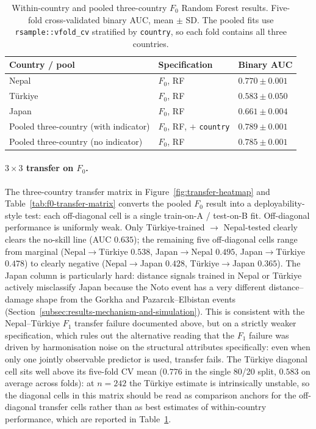 \documentclass[11pt,a4paper]{article}
\begin{document}
\begin{table}[!t]
\centering
\caption{Within-country and pooled three-country $F_0$ Random Forest results. Five-fold cross-validated binary AUC, mean $\pm$ SD. The pooled fits use \texttt{rsample::vfold\_cv} stratified by \texttt{country}, so each fold contains all three countries.}
\label{tab:f0-pooled}
\small
\begin{tabular}{l l l}
\toprule
\textbf{Country / pool} & \textbf{Specification} & \textbf{Binary AUC} \\
\midrule
Nepal                                 & $F_0$, RF                        & $0.770 \pm 0.001$ \\
T\"urkiye                             & $F_0$, RF                        & $0.583 \pm 0.050$ \\
Japan                                 & $F_0$, RF                        & $0.661 \pm 0.004$ \\
\midrule
Pooled three-country (with indicator) & $F_0$, RF, $+$ \texttt{country}  & $0.789 \pm 0.001$ \\
Pooled three-country (no indicator)   & $F_0$, RF                        & $0.785 \pm 0.001$ \\
\bottomrule
\end{tabular}
\end{table}

\paragraph{$3\times 3$ transfer on $F_0$.} The three-country transfer matrix in Figure~\ref{fig:transfer-heatmap} and Table~\ref{tab:f0-transfer-matrix} converts the pooled $F_0$ result into a deployability-style test: each off-diagonal cell is a single train-on-A / test-on-B fit. Off-diagonal performance is uniformly weak. Only T\"urkiye-trained $\rightarrow$ Nepal-tested clearly clears the no-skill line (AUC $0.635$); the remaining five off-diagonal cells range from marginal (Nepal$\rightarrow$T\"urkiye $0.538$, Japan$\rightarrow$Nepal $0.495$, Japan$\rightarrow$T\"urkiye $0.478$) to clearly negative (Nepal$\rightarrow$Japan $0.428$, T\"urkiye$\rightarrow$Japan $0.365$). The Japan column is particularly hard: distance signals trained in Nepal or T\"urkiye actively misclassify Japan because the Noto event has a very different distance--damage shape from the Gorkha and Pazarc{\i}k--Elbistan events (Section~\ref{subsec:results-mechanism-and-simulation}). This is consistent with the Nepal--T\"urkiye $F_1$ transfer failure documented above, but on a strictly weaker specification, which rules out the alternative reading that the $F_1$ failure was driven by harmonisation noise on the structural attributes specifically: even when only one jointly observable predictor is used, transfer fails. The T\"urkiye diagonal cell sits well above its five-fold CV mean ($0.776$ in the single 80/20 split, $0.583$ on average across folds): at $n=242$ the T\"urkiye estimate is intrinsically unstable, so the diagonal cells in this matrix should be read as comparison anchors for the off-diagonal transfer cells rather than as best estimates of within-country performance, which are reported in Table~\ref{tab:f0-pooled}.
\end{document}
